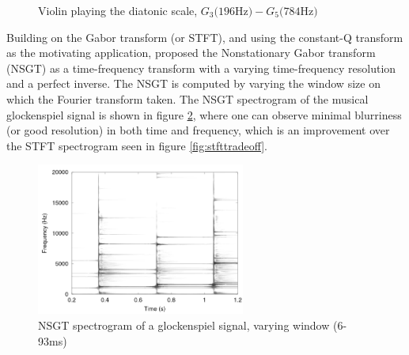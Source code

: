 \documentclass[report.tex]{subfiles}
\begin{document}
\begin{figure}[ht]
	\centering
	\hspace{0.5em}
	\caption{Violin playing the diatonic scale, $G_{3} \text{(196Hz)} - G_{5} \text{(784Hz)}$\cite{jbrown}}
	\label{fig:violin}
\end{figure}

Building on the Gabor transform (or STFT), and using the constant-Q transform as the motivating application, \textcite{balazs} proposed the Nonstationary Gabor transform (NSGT) as a time-frequency transform with a varying time-frequency resolution and a perfect inverse. The NSGT is computed by varying the window size on which the Fourier transform taken. The NSGT spectrogram of the musical glockenspiel signal is shown in figure \ref{fig:nsgttradeoff}, where one can observe minimal blurriness (or good resolution) in both time and frequency, which is an improvement over the STFT spectrogram seen in figure \ref{fig:stfttradeoff}.

\begin{figure}[ht]
	\centering
	\includegraphics[height=5cm]{./images-tftheory/tf_tradeoff_balasz3.png}
	\caption{NSGT spectrogram of a glockenspiel signal, varying window (6-93ms)}
	\label{fig:nsgttradeoff}
\end{figure}
\end{document}
